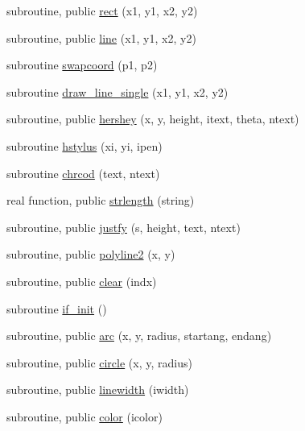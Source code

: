 \begin{DoxyCompactItemize}
\item 
subroutine, public \mbox{\hyperlink{namespacem__pixel_a5435aa0d9d6048a62c09d7d90665b958}{rect}} (x1, y1, x2, y2)
\item 
subroutine, public \mbox{\hyperlink{namespacem__pixel_a491951b89e60d0d40d67f22d987da894}{line}} (x1, y1, x2, y2)
\item 
subroutine \mbox{\hyperlink{namespacem__pixel_a063f74c3dd2f7f086dc47ec68abc22c9}{swapcoord}} (p1, p2)
\item 
subroutine \mbox{\hyperlink{namespacem__pixel_a42791c7e58158616dae7c36ec5806717}{draw\+\_\+line\+\_\+single}} (x1, y1, x2, y2)
\item 
subroutine, public \mbox{\hyperlink{namespacem__pixel_a80dc3cb149287470a9837de8dd3f05bc}{hershey}} (x, y, height, itext, theta, ntext)
\item 
subroutine \mbox{\hyperlink{namespacem__pixel_a15c5daa9ab477991c2c6e17741cf40eb}{hstylus}} (xi, yi, ipen)
\item 
subroutine \mbox{\hyperlink{namespacem__pixel_ab25c6cce708ff91a79bbabb23d591a8b}{chrcod}} (text, ntext)
\item 
real function, public \mbox{\hyperlink{namespacem__pixel_a0468f8d9308bade7f8f2a68a133271d2}{strlength}} (string)
\item 
subroutine, public \mbox{\hyperlink{namespacem__pixel_a7b08886c913b47694edeb60fa747afc4}{justfy}} (s, height, text, ntext)
\item 
subroutine, public \mbox{\hyperlink{namespacem__pixel_a0678be124889fb633475a6724ddb6640}{polyline2}} (x, y)
\item 
subroutine, public \mbox{\hyperlink{namespacem__pixel_af3b81a21a0b2f6b5eddd09c031bd6173}{clear}} (indx)
\item 
subroutine \mbox{\hyperlink{namespacem__pixel_a6c23c2779e54da4ac7505cfb816cc2b1}{if\+\_\+init}} ()
\item 
subroutine, public \mbox{\hyperlink{namespacem__pixel_ab881b9c2adff081a086cd83a1f1341fb}{arc}} (x, y, radius, startang, endang)
\item 
subroutine, public \mbox{\hyperlink{namespacem__pixel_ab3b12cc498ed490014aa5fcc0bb278d2}{circle}} (x, y, radius)
\item 
subroutine, public \mbox{\hyperlink{namespacem__pixel_a16379e283aaa99e2e0ba1eb26e93452d}{linewidth}} (iwidth)
\item 
subroutine, public \mbox{\hyperlink{namespacem__pixel_a334bde41bc7b2db19b950b1271ba7463}{color}} (icolor)

\end{DoxyCompactItemize}
